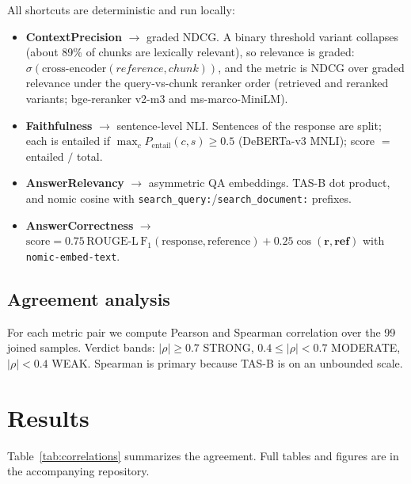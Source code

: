 \documentclass[11pt]{article}
\begin{document}
All shortcuts are deterministic and run locally:

\begin{itemize}[nosep]
  \item \textbf{ContextPrecision} $\rightarrow$ graded NDCG. A binary
  threshold variant collapses (about 89\% of chunks are lexically relevant),
  so relevance is graded: $\sigma(\mathrm{cross{\text{-}}encoder}(reference,
  chunk))$, and the metric is NDCG over graded relevance under the
  query-vs-chunk reranker order (retrieved and reranked variants; bge-reranker
  v2-m3 and ms-marco-MiniLM).
  \item \textbf{Faithfulness} $\rightarrow$ sentence-level NLI. Sentences of
  the response are split; each is entailed if
  $\max_c P_{\mathrm{entail}}(c,s) \ge 0.5$ (DeBERTa-v3 MNLI);
  score $=$ entailed $/$ total.
  \item \textbf{AnswerRelevancy} $\rightarrow$ asymmetric QA embeddings.
  TAS-B dot product, and nomic cosine with
  \texttt{search\_query:}/\texttt{search\_document:} prefixes.
  \item \textbf{AnswerCorrectness} $\rightarrow$
  $\mathrm{score} = 0.75\,\mathrm{ROUGE\text{-}L\,F_1}(\mathrm{response},
  \mathrm{reference}) + 0.25\cos(\mathbf{r},\mathbf{ref})$ with
  \texttt{nomic-embed-text}.
\end{itemize}

\subsection{Agreement analysis}\label{sec:agreement}

For each metric pair we compute Pearson and Spearman correlation over the 99
joined samples. Verdict bands: $|\rho|\ge 0.7$ STRONG, $0.4\le|\rho|<0.7$
MODERATE, $|\rho|<0.4$ WEAK. Spearman is primary because TAS-B is on an
unbounded scale.

\section{Results}\label{sec:results}

Table~\ref{tab:correlations} summarizes the agreement. Full tables and figures
are in the accompanying repository.
\end{document}
